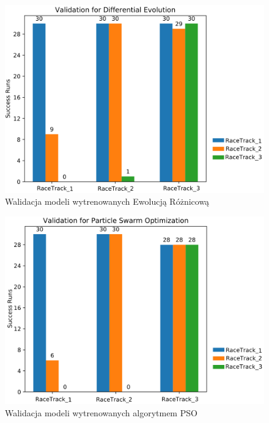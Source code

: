 \vspace{0.5cm}
\begin{figure}[H]
\centering
\includegraphics[width=15cm]{resources/figures/validation_de.png}
\caption{Walidacja modeli wytrenowanych Ewolucją Różnicową}
\label{ValidationDE}
\end{figure}

\begin{figure}[H]
\centering
\includegraphics[width=15cm]{resources/figures/validation_pso.png}
\caption{Walidacja modeli wytrenowanych algorytmem PSO}
\label{ValidationPSO}
\end{figure}

